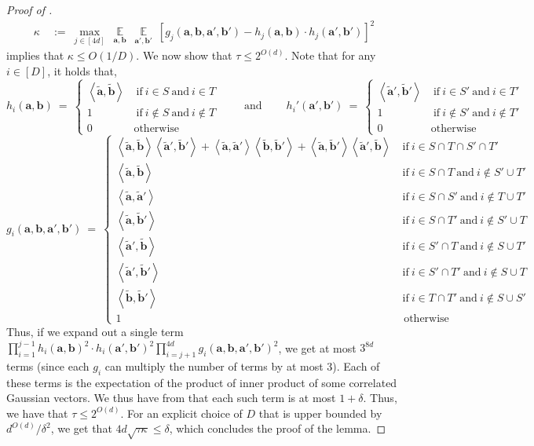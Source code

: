 \documentclass[11pt]{article}
\newcommand{\insquare}[1]{\left [ #1 \right ]}
\newcommand{\inangle}[1]{\left \langle #1 \right \rangle}
\newcommand{\infork}[1]{\left \{ \begin{matrix} #1 \end{matrix} \right .}
\DeclareMathOperator*{\Ex}{\mathbb{E}}
\newcommand{\sAND}{\ \mathrm{and} \ }
\newcommand{\sIF}{\ \mathrm{if} \ }
\newcommand{\wtilde}[1]{\widetilde{#1}}
\newcommand{\ba}{{\bm a}}
\newcommand{\bb}{{\bm b}}
\begin{document}
\begin{proof}[Proof of ]
\begin{align*}
		\kappa &~:=~ \max_{j \in [4d]} ~\Ex\limits_{\ba, \bb} ~\Ex\limits_{\ba', \bb'} ~\insquare{g_j(\ba, \bb, \ba', \bb') - h_j(\ba, \bb) \cdot h_j(\ba', \bb')}^2
	\end{align*}
	 implies that $\kappa \le O(1/D)$. We now show that $\tau \le 2^{O(d)}$. Note that for any $i \in [D]$, it holds that,
	\[
		h_i(\ba, \bb) ~=~ \infork{\inangle{\wtilde{\ba}, \wtilde{\bb}} & \sIF i \in S \sAND i \in T\\ 1 & \sIF i \notin S \sAND i \notin T \\ 0 & \text{otherwise}}
		\qquad \sAND \qquad
		h_i'(\ba', \bb') ~=~ \infork{\inangle{\wtilde{\ba}', \wtilde{\bb}'} & \sIF i \in S' \sAND i \in T'\\ 1 & \sIF i \notin S' \sAND i \notin T' \\ 0 & \text{otherwise}}
	\]
	\[
	g_i(\ba, \bb, \ba', \bb') ~=~ \infork{
		\inangle{\wtilde{\ba}, \wtilde{\bb}}\inangle{\wtilde{\ba}', \wtilde{\bb}'} + \inangle{\wtilde{\ba}, \wtilde{\ba}'}\inangle{\wtilde{\bb}, \wtilde{\bb}'} + \inangle{\wtilde{\ba}, \wtilde{\bb}'}\inangle{\wtilde{\ba}', \wtilde{\bb}} & \sIF i \in S \cap T \cap S' \cap T' \\
		\inangle{\wtilde{\ba}, \wtilde{\bb}} & \sIF i \in S \cap T \sAND i \notin S' \cup T' \\
		\inangle{\wtilde{\ba}, \wtilde{\ba}'} & \sIF i \in S \cap S' \sAND i \notin T \cup T' \\
		\inangle{\wtilde{\ba}, \wtilde{\bb}'} & \sIF i \in S \cap T' \sAND i \notin S' \cup T \\
		\inangle{\wtilde{\ba}', \wtilde{\bb}} & \sIF i \in S' \cap T \sAND i \notin S \cup T' \\
		\inangle{\wtilde{\ba}', \wtilde{\bb}'} & \sIF i \in S' \cap T' \sAND i \notin S \cup T \\
		\inangle{\wtilde{\bb}, \wtilde{\bb}'} & \sIF i \in T \cap T' \sAND i \notin S \cup S' \\
		1 & \text{ otherwise}
		}
	\]
	Thus, if we expand out a single term $\prod_{i = 1}^{j-1} h_i(\ba, \bb)^2 \cdot h_i(\ba', \bb')^2 \prod_{i = j+1}^{4d} g_i(\ba, \bb, \ba', \bb')^2$, we get at most $3^{8d}$ terms (since each $g_i$ can multiply the number of terms by at most $3$). Each of these terms is the expectation of the product of inner product of some correlated Gaussian vectors. We thus have from  that each such term is at most $1 + \delta$. Thus, we have that $\tau \le 2^{O(d)}$. For an explicit choice of $D$ that is upper bounded by $d^{O(d)}/\delta^2$, we get that $4 d \sqrt{\tau \kappa} \le \delta$, which concludes the proof of the lemma.
\end{proof}
\end{document}
